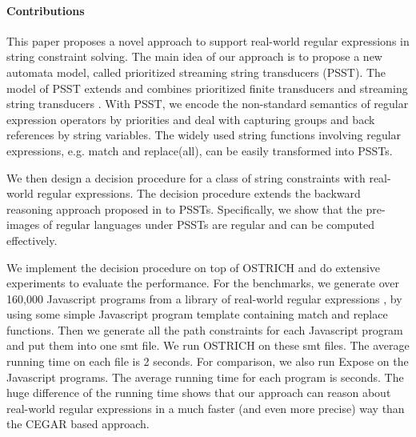 
\paragraph*{Contributions}
This paper proposes a novel approach to support real-world regular expressions in string constraint solving. The main idea of our approach is to propose a new automata model, called prioritized streaming string transducers (PSST). The model of PSST extends and combines prioritized finite transducers \cite{BM17} and streaming string transducers \cite{AC10,AD11}. With PSST, we encode the non-standard semantics of regular expression operators by priorities and deal with capturing groups and back references by string variables. 
The widely used string functions involving regular expressions, e.g. match and replace(all), can be easily transformed into PSSTs. 

We then design a decision procedure for a class of string constraints with real-world regular expressions. The decision procedure extends the backward reasoning approach proposed in \cite{CHL+19} to PSSTs. Specifically, we show that the pre-images of regular languages under PSSTs are regular and can be computed effectively. 

We implement the decision procedure on top of OSTRICH and do extensive experiments to evaluate the performance. For the benchmarks, we generate over 160,000 Javascript programs from a library of real-world regular expressions \cite{DMC+19}, by using some simple Javascript program template containing match and replace functions.  Then we generate all the path constraints for each Javascript program and put them into one smt file. We run OSTRICH on these smt files. The average running time on each file is 2 seconds. For comparison, we also run Expose on the Javascript programs. The average running time for each program is  seconds. The huge difference of the running time shows that our approach can reason about real-world regular expressions in a much faster (and even more precise) way than the CEGAR based approach.


